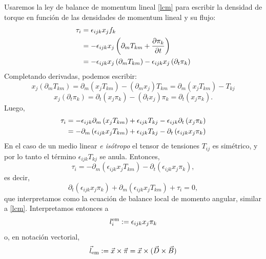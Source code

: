 Usaremos la ley de balance de momentum lineal \eqref{lcm} para escribir la densidad de torque en función de las densidades de momentum lineal y su flujo:
\begin{align}
\tau_i &= \epsilon _{ijk}x_{j}f_{k} \\
&=-\epsilon _{ijk}x_{j}\left( \partial _{m}T_{km}+\frac{\partial \pi _{k}}{%
\partial t}\right)  \\
&=-\epsilon _{ijk}x_{j}\left( \partial _{m}T_{km}\right) -\epsilon
_{ijk}x_{j}\left( \partial _{t}\pi _{k}\right) 
\end{align}%
Completando derivadas, podemos escribir:
\begin{equation}
x_{j}\left( \partial _{m}T_{km}\right)  =\partial _{m}\left(
x_{j}T_{km}\right) -(\partial _{m}x_{j})T_{km} = \partial _{m}\left(
x_{j}T_{km}\right) -T_{kj}
\end{equation}
\begin{equation}
x_{j}\left( \partial _{t}\pi _{k}\right)  =\partial _{t}\left( x_{j}\pi
_{k}\right) -(\partial _{t}x_{j})\pi _{k} = \partial _{t}\left( x_{j}\pi
_{k}\right).
\end{equation}
Luego,%
\begin{align}
\tau_i &= -\epsilon _{ijk}\partial _{m}\left(
x_{j}T_{km}\right) +\epsilon _{ijk}T_{kj}-\epsilon
_{ijk}\partial _{t}\left( x_{j}\pi _{k}\right)   \notag \\
&= -\partial _{m}\left( \epsilon _{ijk}x_{j}T_{km}\right) +\epsilon
_{ijk}T_{kj}-\partial _{t}\left( \epsilon _{ijk}x_{j}\pi _{k}\right) 
\end{align}
En el caso de un medio linear \textit{e isótropo} el tensor de tensiones $T_{ij}$ es simétrico, y por lo tanto el término $\epsilon_{ijk}T_{kj}$ se anula. Entonces,
\begin{equation}
\tau_i =-\partial _{m}\left( \epsilon
_{ijk}x_{j}T_{km}\right) -\partial _{t}\left( \epsilon _{ijk}x_{j}\pi
_{k}\right) ,
\end{equation}%
es decir,
\begin{equation}
\partial _{t}\left( \epsilon _{ijk}x_{j}\pi_{k}\right) + \partial _{m}\left( \epsilon_{ijk}x_{j}T_{km}\right)+ \tau_i =0,
\end{equation}%
que interpretamos como la ecuación de balance local de momento angular, similar a \eqref{lcm}. Interpretamos entonces a 
\begin{equation}
l_{i}^{\rm em}:=\epsilon _{ijk}x_{j}\pi_{k}
\end{equation}
o, en notación vectorial,
\begin{equation}
\vec{l}_{\rm em}:=\vec{x}\times\vec{\pi} =\vec{x}\times(\vec{D}\times\vec{B})
\end{equation}
